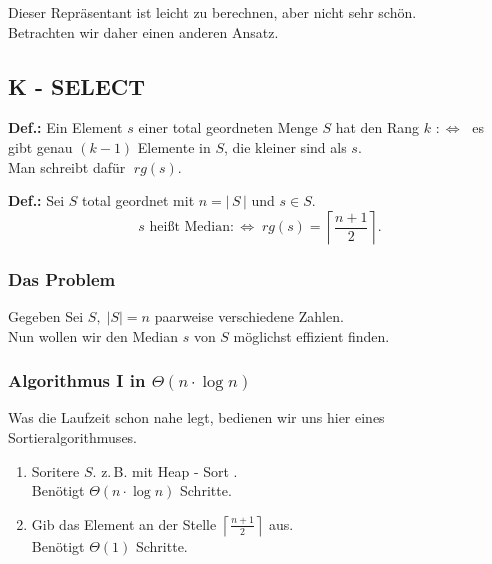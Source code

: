 Dieser Repräsentant ist leicht zu berechnen, aber nicht sehr schön.\\
Betrachten wir daher einen anderen Ansatz.

\subsection{K - SELECT}

\begin{description}

\item{\bfseries Def.:} Ein Element $s$ einer total geordneten Menge $S$ hat den Rang $k$ $:\Leftrightarrow \;$ es gibt genau $(k-1)$ Elemente in $S$, die kleiner sind als $s$.\\

Man schreibt dafür $\; rg(s)$.

\item{\bfseries Def.:} Sei $S$ total geordnet mit $n = |\,S\,|$ und $s\in S$.\\
$$s \text{ heißt Median} :\Leftrightarrow \; rg(s) = \left\lceil \frac{n+1}{2} \right\rceil .$$

\end{description}

\subsubsection{Das Problem}

Gegeben Sei $S, \; |S| = n$ paarweise verschiedene Zahlen.\\
Nun wollen wir den Median $s$ von $S$ möglichst effizient finden.

\subsubsection{Algorithmus I in $\Theta(n \cdot \log n)$}

Was die Laufzeit schon nahe legt, bedienen wir uns hier eines Sortieralgorithmuses.

\begin{enumerate}

\item Soritere $S$. z.\,B. mit Heap - Sort .\\
Benötigt $\Theta (n\cdot \log n)$ Schritte.

\item Gib das Element an der Stelle $\left\lceil \frac{n+1}{2} \right\rceil$ aus.\\
Benötigt $\Theta (1)$ Schritte.

\end{enumerate}

